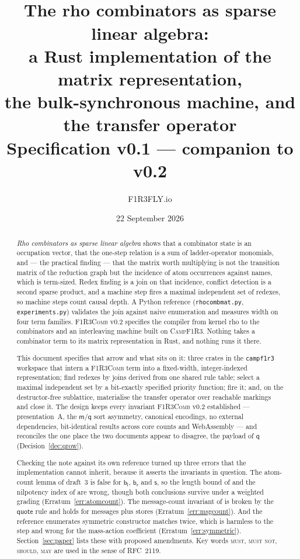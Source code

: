 \documentclass[11pt,a4paper]{article}
\title{\textbf{\Mat}\\[1mm]
\large The rho combinators as sparse linear algebra:\\
a Rust implementation of the matrix representation,\\
the bulk-synchronous machine, and the transfer operator\\[2mm]
\normalsize Specification v0.1 --- companion to \Comb{} v0.2}
\author{F1R3FLY.io}
\date{22 September 2026}
\newcommand{\code}[1]{\texttt{#1}}
\newcommand{\Comb}{\textsc{F1R3Comb}}
\newcommand{\Camp}{\textsc{CampF1R3}}
\newcommand{\MUST}{\textsc{must}}
\newcommand{\MUSTNOT}{\textsc{must not}}
\newcommand{\SHOULD}{\textsc{should}}
\newcommand{\MAY}{\textsc{may}}
\newcommand{\mm}{\mathsf{m}}
\newcommand{\bl}{\mathsf{b}_{\mathsf{l}}}
\newcommand{\br}{\mathsf{b}_{\mathsf{r}}}
\newcommand{\sy}{\mathsf{s}}
\newcommand{\qq}{\mathsf{q}}
\theoremstyle{definition}
\theoremstyle{plain}
\begin{document}
\maketitle

\begin{abstract}
\noindent
\emph{Rho combinators as sparse linear algebra} \cite{matnote} shows that a
combinator state is an occupation vector, that the one-step relation is a sum
of ladder-operator monomials, and --- the practical finding --- that the matrix
worth multiplying is not the transition matrix of the reduction graph but the
incidence of atom occurrences against names, which is term-sized. Redex
finding is a join on that incidence, conflict detection is a second sparse
product, and a machine step fires a maximal independent set of redexes, so
machine steps count causal depth. A Python reference
(\code{rhocombmat.py}, \code{experiments.py}) validates the join against naive
enumeration and measures width on four term families. \Comb{} v0.2
\cite{combspec} specifies the compiler from kernel rho to the combinators and
an interleaving machine built on \Camp. Nothing takes a combinator term to its
matrix representation in Rust, and nothing runs it there.

This document specifies that arrow and what sits on it: three crates in the
\code{campf1r3} workspace that intern a \Comb{} term into a fixed-width,
integer-indexed representation; find redexes by joins derived from one shared
rule table; select a maximal independent set by a bit-exactly specified
priority function; fire it; and, on the destructor-free sublattice, materialise
the transfer operator over reachable markings and close it. The design keeps
every invariant \Comb{} v0.2 established --- presentation~A, the
$\mm$/$\qq$ sort asymmetry, canonical encodings, no external dependencies,
bit-identical results across core counts and WebAssembly --- and reconciles the
one place the two documents appear to disagree, the payload of $\qq$
(Decision~\ref{dec:qrow}).

Checking the note against its own reference turned up three errors that the
implementation cannot inherit, because it asserts the invariants in question.
The atom-count lemma of draft~3 \cite[Lem.~9.2]{draft3} is false for $\bl$,
$\br$ and $\sy$, so the length bound of \cite[Prop.~9.9]{draft3} and the
nilpotency index of \cite[Thm.~6.1(ii)]{matnote} are wrong, though both
conclusions survive under a weighted grading (Erratum~\ref{err:atomcount}).
The message-count invariant of \cite[Thm.~6.1(iii)]{matnote} is broken by the
$\mathsf{quote}$ rule and holds for messages plus stores
(Erratum~\ref{err:msgcount}). And the reference enumerates symmetric
constructor matches twice, which is harmless to the step and wrong for the
mass-action coefficient (Erratum~\ref{err:symmetric}).
Section~\ref{sec:paper} lists these with proposed amendments. Key words
\MUST, \MUSTNOT, \SHOULD, \MAY{} are used in the sense of RFC~2119.
\end{abstract}
\end{document}
